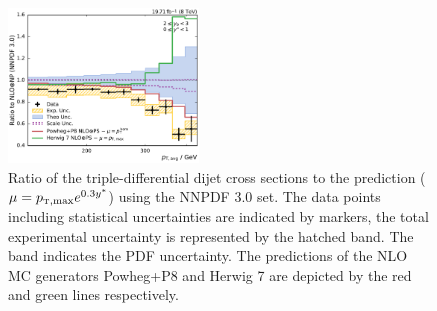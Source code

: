 \begin{figure}[htbp]
    \includegraphics[width=0.45\textwidth]{figures/measurement/ratio_to_NNPDF30+np_varcomp_yb2ys0.pdf}
    \caption[Ratio of measured cross sections to predictions using different MC event generators]{
    Ratio of the triple-differential dijet cross sections to the \NLOJETPP
    prediction ($\mu=\ptmax e^{0.3 \ystar}$) using the NNPDF 3.0 set. The data
    points including statistical uncertainties are indicated by markers, the
    total experimental uncertainty is represented by the hatched band. The band
    indicates the PDF uncertainty. The predictions of the NLO MC generators
    Powheg+P8 and Herwig 7 are depicted by the red and green lines respectively.}
    \label{fig:ratio_nnpdf30_mccomp_nlo}
\end{figure}


